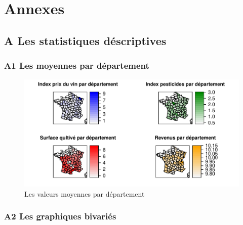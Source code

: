 \documentclass[11pt,]{article}
\begin{document}
\FloatBarrier

\newpage

\hypertarget{annexes}{%
\section{Annexes}\label{annexes}}

\hypertarget{a-les-statistiques-descriptives}{%
\subsection{A Les statistiques
déscriptives}\label{a-les-statistiques-descriptives}}

\hypertarget{a1-les-moyennes-par-departement}{%
\subsubsection{A1 Les moyennes par
département}\label{a1-les-moyennes-par-departement}}

\FloatBarrier

\begin{figure}[!htbp]

{\centering \includegraphics{note2pres_files/figure-latex/unnamed-chunk-51-1} 

}

\caption{Les valeurs moyennes par département}\label{fig:unnamed-chunk-51}
\end{figure}

\FloatBarrier

\newpage

\hypertarget{a2-les-graphiques-bivaries}{%
\subsubsection{A2 Les graphiques
bivariés}\label{a2-les-graphiques-bivaries}}
\end{document}
